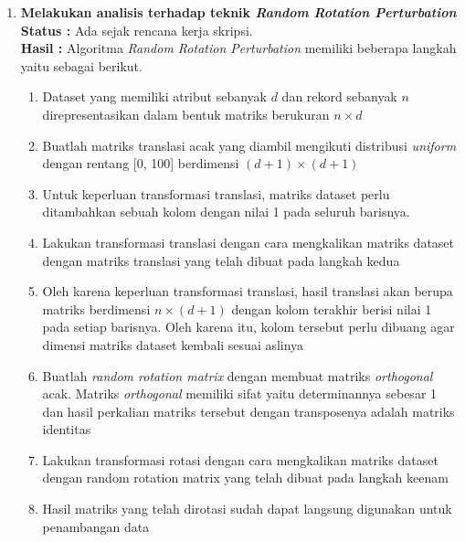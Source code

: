 \documentclass[a4paper,twoside]{article}
\begin{document}
\begin{enumerate}
		\item \textbf{Melakukan analisis terhadap teknik \textit{Random Rotation Perturbation}}\\
		{\bf Status :} Ada sejak rencana kerja skripsi.\\
		{\bf Hasil :} Algoritma \textit{Random Rotation Perturbation} memiliki beberapa langkah yaitu sebagai berikut.
		\begin{enumerate}
			\item Dataset yang memiliki atribut sebanyak \(d\) dan rekord sebanyak \(n\) direpresentasikan dalam bentuk matriks berukuran \(n \times d\)
			\item Buatlah matriks translasi acak yang diambil mengikuti distribusi \textit{uniform} dengan rentang [0, 100] berdimensi \((d+1)\times(d+1)\)
			\item Untuk keperluan transformasi translasi, matriks dataset perlu ditambahkan sebuah kolom dengan nilai 1 pada seluruh barisnya.
			\item Lakukan transformasi translasi dengan cara mengkalikan matriks dataset dengan matriks translasi yang telah dibuat pada langkah kedua
			\item Oleh karena keperluan transformasi translasi, hasil translasi akan berupa matriks berdimensi \(n\times(d+1)\) dengan kolom terakhir berisi nilai 1 pada setiap barisnya. Oleh karena itu, kolom tersebut perlu dibuang agar dimensi matriks dataset kembali sesuai aslinya
			\item Buatlah \textit{random rotation matrix} dengan membuat matriks \textit{orthogonal} acak. Matriks \textit{orthogonal} memiliki sifat yaitu determinannya sebesar 1 dan hasil perkalian matriks tersebut dengan transposenya adalah matriks identitas
			\item Lakukan transformasi rotasi dengan cara mengkalikan matriks dataset dengan random rotation matrix yang telah dibuat pada langkah keenam
			\item Hasil matriks yang telah dirotasi sudah dapat langsung digunakan untuk penambangan data
		\end{enumerate}


\end{enumerate}
\end{document}
